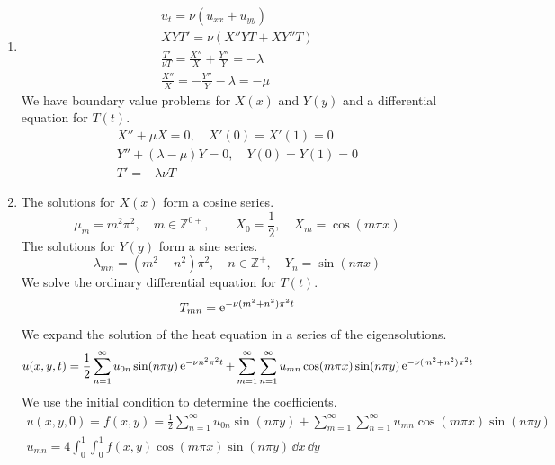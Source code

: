 {\begin{Solution}
\begin{enumerate}
  \end{enumerate}
\end{Solution}















\begin{Solution}
  \label{solution head 2D insulated fixed initial}
  \begin{enumerate}
  \item 
    \begin{gather*}
      u_t = \nu (u_{x x} + u_{y y})
      \\
      X Y T' = \nu (X'' Y T + X Y'' T)
      \\
      \frac{T'}{\nu T} = \frac{X''}{X} + \frac{Y''}{Y} = - \lambda
      \\
      \frac{X''}{X} = - \frac{Y''}{Y} - \lambda = - \mu
    \end{gather*}
    We have boundary value problems for $X(x)$ and $Y(y)$ and a differential
    equation for $T(t)$.
    \begin{gather*}
      X'' + \mu X = 0, \quad X'(0) = X'(1) = 0
      \\
      Y'' + (\lambda - \mu) Y = 0, \quad Y(0) = Y(1) = 0
      \\
      T' = - \lambda \nu T
    \end{gather*}
  \item 
    The solutions for $X(x)$ form a cosine series.
    \[
    \mu_m = m^2 \pi^2, \quad m \in \mathbb{Z}^{0+}, \qquad
    X_0 = \frac{1}{2}, \quad X_m = \cos(m \pi x)
    \]
    The solutions for $Y(y)$ form a sine series.
    \[
    \lambda_{m n} = (m^2 + n^2) \pi^2, \quad n \in \mathbb{Z}^+, \quad
    Y_n = \sin(n \pi x)
    \]
    We solve the ordinary differential equation for $T(t)$.
    \[
    T_{m n} = \mathop{\mathrm{e}}\nolimits^{-\nu (m^2 + n^2) \pi^2 t}
    \]
    We expand the solution of the heat equation in a series of the 
    eigensolutions.
    \[
    u(x,y,t) = \frac{1}{2} \sum_{n = 1}^\infty u_{0n} \sin(n \pi y) \mathop{\mathrm{e}}\nolimits^{-\nu n^2 \pi^2 t}
    + \sum_{m = 1}^\infty \sum_{n = 1}^\infty u_{mn} \cos(m \pi x) \sin(n \pi y) \mathop{\mathrm{e}}\nolimits^{-\nu (m^2 + n^2) \pi^2 t}
    \]
    We use the initial condition to determine the coefficients.
    \begin{gather*}
      u(x,y,0) = f(x,y) = \frac{1}{2} \sum_{n = 1}^\infty u_{0n} \sin(n \pi y)
      + \sum_{m = 1}^\infty \sum_{n = 1}^\infty u_{mn} \cos(m \pi x) \sin(n \pi y)
      \\
      u_{m n} = 4 \int_0^1 \int_0^1 f(x,y) \cos(m \pi x) \sin(n \pi y) \,\dd x \,\dd y
    \end{gather*}
  \end{enumerate}
\end{Solution}














}
